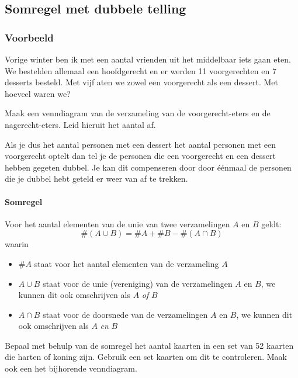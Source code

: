 \documentclass[12pt,twoside]{article}
\begin{document}
\begin{theorie}

\subsection{Somregel met dubbele telling}

\subsubsection*{Voorbeeld}

Vorige winter ben ik met een aantal vrienden uit het middelbaar iets gaan eten. We bestelden allemaal een hoofdgerecht en er werden 11 voorgerechten en 7 desserts besteld. Met vijf aten we zowel een voorgerecht als een dessert. Met hoeveel waren we?

Maak een venndiagram van de verzameling van de voorgerecht-eters en de nagerecht-eters. Leid hieruit het aantal af.
\vspace*{4cm}

Als je dus het aantal personen met een dessert het aantal personen met een voorgerecht optelt dan tel je de personen die een voorgerecht en een dessert hebben gegeten dubbel. Je kan dit compenseren door door éénmaal de personen die je dubbel hebt geteld er weer van af te trekken.

\paragraph*{Somregel}
\begin{mdframed}
Voor het aantal elementen van de unie van twee verzamelingen $A$ en $B$ geldt:
$$\#(A\cup B) = \#A + \#B - \#(A\cap B)$$
waarin
\begin{itemize}
  \item $\#A$ staat voor het aantal elementen van de verzameling $A$
  \item $A\cup B$ staat voor de unie (vereniging) van de verzamelingen $A$ en $B$, we kunnen dit ook omschrijven als $A$ {\em of} $B$
  \item $A\cap B$ staat voor de doorsnede van de verzamelingen $A$ en $B$, we kunnen dit ook omschrijven als $A$ {\em en} $B$
\end{itemize}
\end{mdframed}

\end{theorie}

\begin{oefening}
Bepaal met behulp van de somregel het aantal kaarten in een set van 52 kaarten die harten of koning zijn. Gebruik een set kaarten om dit te controleren. Maak ook een het bijhorende venndiagram.
\end{oefening}
\end{document}
